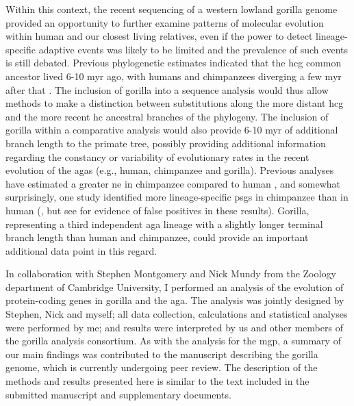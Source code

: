 Within this context, the recent sequencing of a western lowland
gorilla genome provided an opportunity to further examine patterns of
molecular evolution within human and our closest living relatives,
even if the power to detect lineage-specific adaptive events was
likely to be limited and the prevalence of such events is still
debated. Previous phylogenetic estimates indicated that the \ac{hcg}
common ancestor lived 6-10 \ac{myr} ago, with humans and chimpanzees
diverging a few \ac{myr} after that \citep{Bradley2008}. The inclusion
of gorilla into a sequence analysis would thus allow methods to make a
distinction between substitutions along the more distant \ac{hcg} and
the more recent \ac{hc} ancestral branches of the phylogeny. The
inclusion of gorilla within a comparative analysis would also provide
6-10 \ac{myr} of additional branch length to the primate tree,
possibly providing additional information regarding the constancy or
variability of evolutionary rates in the recent evolution of the
\acp{aga} (e.g., human, chimpanzee and gorilla). Previous analyses have
estimated a greater \ac{ne} in chimpanzee compared to human
\citep{Sequencing2005a,Siepel2009a}, and somewhat surprisingly, one
study identified more lineage-specific \acp{psg} in chimpanzee than in
human (\citet{Bakewell2007}, but see \citet{Mallick2009} for evidence
of false positives in these results). Gorilla, representing a third
independent \ac{aga} lineage with a slightly longer terminal branch
length than human and chimpanzee, could provide an important
additional data point in this regard.

In collaboration with Stephen Montgomery and Nick Mundy from the
Zoology department of Cambridge University, I performed an analysis of
the evolution of protein-coding genes in gorilla and the \ac{aga}. The
analysis was jointly designed by Stephen, Nick and myself; all data
collection, calculations and statistical analyses were performed by
me; and results were interpreted by us and other members of the
gorilla analysis consortium. As with the analysis for the \acl{mgp}, a
summary of our main findings was contributed to the manuscript
describing the gorilla genome, which is currently undergoing peer
review. The description of the methods and results presented here is
similar to the text included in the submitted manuscript and
supplementary documents.

